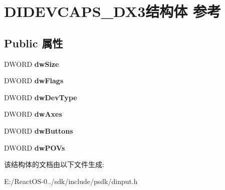 \hypertarget{struct_d_i_d_e_v_c_a_p_s___d_x3}{}\section{D\+I\+D\+E\+V\+C\+A\+P\+S\+\_\+\+D\+X3结构体 参考}
\label{struct_d_i_d_e_v_c_a_p_s___d_x3}
\subsection*{Public 属性}
\begin{DoxyCompactItemize}
\item 
\mbox{\label{struct_d_i_d_e_v_c_a_p_s___d_x3_a8326c31bd94bd6e7e4329254a2cf1039}} 
D\+W\+O\+RD {\bfseries dw\+Size}
\item 
\mbox{\label{struct_d_i_d_e_v_c_a_p_s___d_x3_ac1b37945e13e2800d640dd6c2aef4e47}} 
D\+W\+O\+RD {\bfseries dw\+Flags}
\item 
\mbox{\label{struct_d_i_d_e_v_c_a_p_s___d_x3_a3ba660487a247fb2d718ae99b5fa316b}} 
D\+W\+O\+RD {\bfseries dw\+Dev\+Type}
\item 
\mbox{\label{struct_d_i_d_e_v_c_a_p_s___d_x3_a4b2cf49780fb8f068dff2e665c750dee}} 
D\+W\+O\+RD {\bfseries dw\+Axes}
\item 
\mbox{\label{struct_d_i_d_e_v_c_a_p_s___d_x3_a15bf4de36cf993a8fa12e67143e4f73e}} 
D\+W\+O\+RD {\bfseries dw\+Buttons}
\item 
\mbox{\label{struct_d_i_d_e_v_c_a_p_s___d_x3_ad65b3e8282d28c2c24517876fbb44aac}} 
D\+W\+O\+RD {\bfseries dw\+P\+O\+Vs}
\end{DoxyCompactItemize}


该结构体的文档由以下文件生成\+:\begin{DoxyCompactItemize}
\item 
E\+:/\+React\+O\+S-\/0../sdk/include/psdk/dinput.\+h\end{DoxyCompactItemize}
